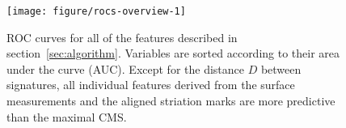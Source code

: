 \documentclass[aoas, preprint]{imsart}\usepackage[]{graphicx}\usepackage[]{color}
\newenvironment{knitrout}{}{} %
\begin{document}

\begin{figure}[hbtp]
  \centering
\begin{knitrout}
\color{fgcolor}
\texttt{[image: figure/rocs-overview-1]} 

\end{knitrout}
\caption{\label{fig:rocs}ROC curves for all of the features described in section~\ref{sec:algorithm}. Variables are sorted according to their area under the curve (AUC). Except for the distance $D$ between signatures, all individual features derived from the surface measurements and the aligned striation marks are more predictive than the maximal CMS. }
\end{figure}
\end{document}
